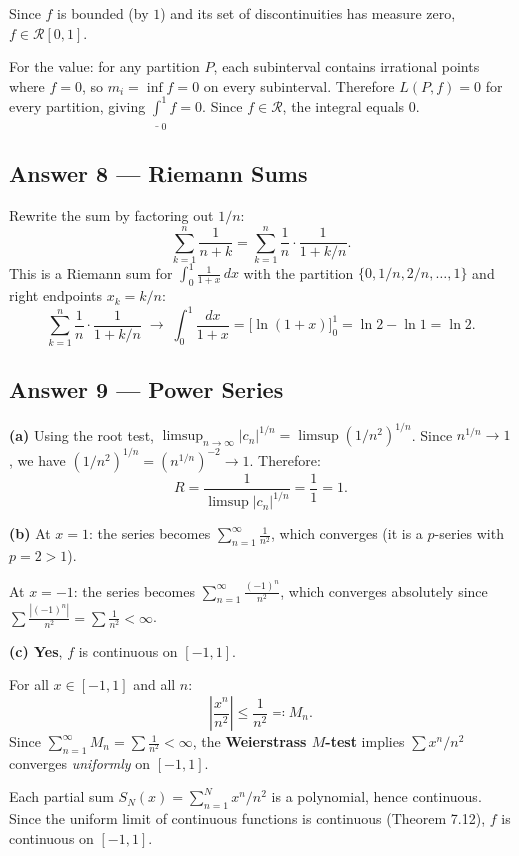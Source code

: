 \documentclass[10pt]{article}
\begin{document}
Since $f$ is bounded (by $1$) and its set of discontinuities has measure zero, $f \in \mathscr{R}[0,1]$.

For the value: for any partition $P$, each subinterval contains irrational points where $f = 0$, so $m_i = \inf f = 0$ on every subinterval. Therefore $L(P, f) = 0$ for every partition, giving $\underline{\int}_0^1 f = 0$. Since $f \in \mathscr{R}$, the integral equals $0$.

\subsection{Answer 8 --- Riemann Sums}

Rewrite the sum by factoring out $1/n$:
$$
\sum_{k=1}^{n} \frac{1}{n+k} = \sum_{k=1}^{n} \frac{1}{n} \cdot \frac{1}{1 + k/n}.
$$
This is a Riemann sum for $\displaystyle\int_0^1 \frac{1}{1+x}\,dx$ with the partition $\{0, 1/n, 2/n, \ldots, 1\}$ and right endpoints $x_k = k/n$:
$$
\sum_{k=1}^{n} \frac{1}{n} \cdot \frac{1}{1 + k/n} \;\longrightarrow\; \int_0^1 \frac{dx}{1+x} = \bigl[\ln(1+x)\bigr]_0^1 = \ln 2 - \ln 1 = \boxed{\ln 2}.
$$

\subsection{Answer 9 --- Power Series}

\textbf{(a)} Using the root test, $\limsup_{n \to \infty} |c_n|^{1/n} = \limsup (1/n^2)^{1/n}$. Since $n^{1/n} \to 1$, we have $(1/n^2)^{1/n} = (n^{1/n})^{-2} \to 1$. Therefore:
$$
R = \frac{1}{\limsup |c_n|^{1/n}} = \frac{1}{1} = 1.
$$

\medskip

\textbf{(b)} At $x = 1$: the series becomes $\displaystyle\sum_{n=1}^{\infty} \frac{1}{n^2}$, which converges (it is a $p$-series with $p = 2 > 1$).

At $x = -1$: the series becomes $\displaystyle\sum_{n=1}^{\infty} \frac{(-1)^n}{n^2}$, which converges absolutely since $\displaystyle\sum \frac{|(-1)^n|}{n^2} = \sum \frac{1}{n^2} < \infty$.

\medskip

\textbf{(c) Yes}, $f$ is continuous on $[-1, 1]$.

For all $x \in [-1,1]$ and all $n$:
$$
\left|\frac{x^n}{n^2}\right| \leq \frac{1}{n^2} \eqqcolon M_n.
$$
Since $\displaystyle\sum_{n=1}^{\infty} M_n = \sum \frac{1}{n^2} < \infty$, the \textbf{Weierstrass $M$-test} implies $\sum x^n/n^2$ converges \emph{uniformly} on $[-1,1]$.

Each partial sum $S_N(x) = \sum_{n=1}^N x^n/n^2$ is a polynomial, hence continuous. Since the uniform limit of continuous functions is continuous (Theorem 7.12), $f$ is continuous on $[-1,1]$.
\end{document}
